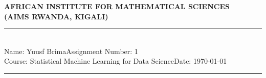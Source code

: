 \documentclass[12pt,a4paper]{article}
\newcommand{\student}{Yuusf Brima}
\newcommand{\course}{Statistical Machine Learning for Data Science}
\newcommand{\assignment}{1}
\begin{document}
\thispagestyle{empty}
\begin{center}
\textbf{AFRICAN INSTITUTE FOR MATHEMATICAL SCIENCES \\[0.5cm]
(AIMS RWANDA, KIGALI)}
\vspace{1.0cm}
\end{center}

\noindent
\rule{17cm}{0.2cm}\\[0.3cm]
Name: \student \hfill Assignment Number: \assignment\\[0.1cm]
Course: \course \hfill Date: \today\\
\rule{17cm}{0.05cm}
\vspace{1.0cm}
\end{document}
